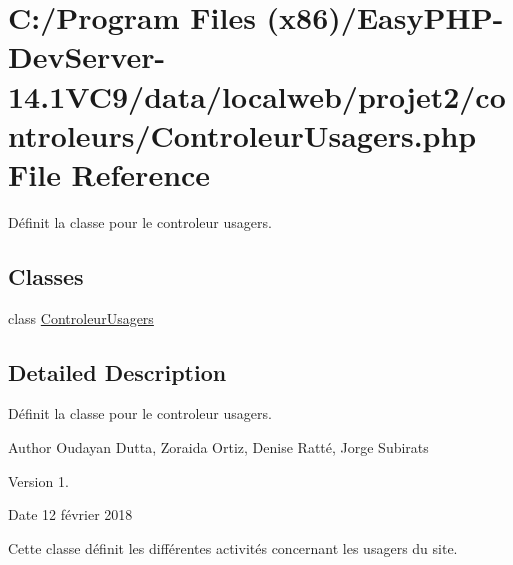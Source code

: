 \hypertarget{_controleur_usagers_8php}{}\section{C\+:/\+Program Files (x86)/\+Easy\+P\+H\+P-\/\+Dev\+Server-\/14.1\+V\+C9/data/localweb/projet2/controleurs/\+Controleur\+Usagers.php File Reference}
\label{_controleur_usagers_8php}


Définit la classe pour le controleur usagers.  


\subsection*{Classes}
\begin{DoxyCompactItemize}
\item 
class \hyperlink{class_controleur_usagers}{Controleur\+Usagers}
\end{DoxyCompactItemize}


\subsection{Detailed Description}
Définit la classe pour le controleur usagers. 

\begin{DoxyAuthor}{Author}
Oudayan Dutta, Zoraida Ortiz, Denise Ratté, Jorge Subirats 
\end{DoxyAuthor}
\begin{DoxyVersion}{Version}
1. 
\end{DoxyVersion}
\begin{DoxyDate}{Date}
12 février 2018
\end{DoxyDate}
Cette classe définit les différentes activités concernant les usagers du site. 